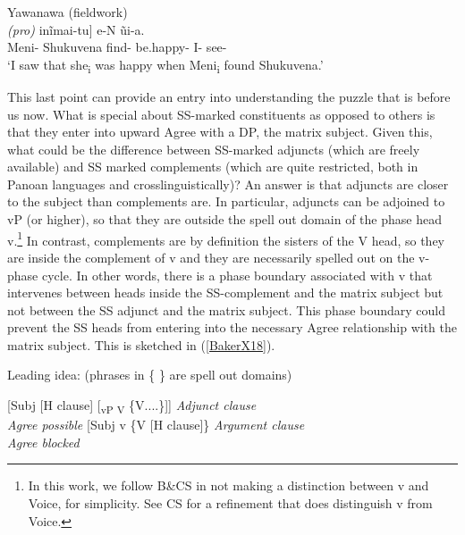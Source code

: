 \documentclass[output=paper]{langscibook}
\begin{document}
\begin{exe}
\ex Yawanawa (fieldwork) \label{BakerX17}\\
    \gll [[Meni-N Shukuvena vetxi-\textit{ashe}] \textit{(pro)} inĩmai-tu] e-N ũi-a.\\
        Meni- Shukuvena find- be.happy- I- see-\\
    \glt `I saw that she\textsubscript{i} was happy when Meni\textsubscript{i} found Shukuvena.'
\end{exe}

This last point can provide an entry into understanding the puzzle that is before us now. What is special about SS-marked constituents as opposed to others is that they enter into upward Agree with a DP, the matrix subject. Given this, what could be the difference between SS-marked adjuncts (which are freely available) and SS marked complements (which are quite restricted, both in Panoan languages and crosslinguistically)? An answer is that adjuncts are closer to the subject than complements are. In particular, adjuncts can be adjoined to vP (or higher), so that they are outside the spell out domain of the phase head v.\footnote{In this work, we follow B\&CS in not making a distinction between v and Voice, for simplicity. See CS for a refinement that does distinguish v from Voice.} In contrast, complements are by definition the sisters of the V head, so they are inside the complement of v and they are necessarily spelled out on the v-phase cycle. In other words, there is a phase boundary associated with v that intervenes between heads inside the SS-complement and the matrix subject but not between the SS adjunct and the matrix subject. This phase boundary could prevent the SS heads from entering into the necessary Agree relationship with the matrix subject. This is sketched in (\ref{BakerX18}).

\begin{exe}
\ex Leading idea: (phrases in \{ \} are spell out domains) \label{BakerX18}
    \begin{xlist}
		\ex \label{BakerX18a}
		    [Subj [H clause] [\textsubscript{vP V} \{V....\}]] \textit{Adjunct clause}
				\\
				\hspace*{3.5em} \textit{Agree possible}
		    \vspace{8pt}
		\ex \label{BakerX18b}
		    [Subj v \{V [H clause]\} \textit{Argument clause}
				\\
				\hspace*{5.3em} \textit{Agree blocked}
			\vspace{12pt}
	\end{xlist}
\end{exe}
\end{document}
